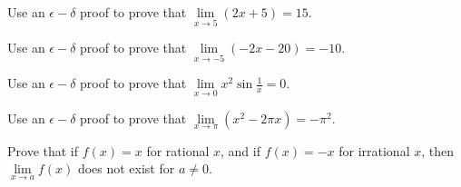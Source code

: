 \documentclass[12pt,letterpaper]{hmcpset}
\begin{document}

\begin{problem}
    Use an $\epsilon-\delta$ proof to prove that $\lim\limits_{x\to 5}\left(2x+5\right) = 15$.
\end{problem}

\begin{solution}

\end{solution}
\newpage

\begin{problem}
    Use an $\epsilon-\delta$ proof to prove that $\lim\limits_{x\to -5}\left(-2x-20\right) = -10$.
\end{problem}

\begin{solution}

\end{solution}
\newpage

\begin{problem}
    Use an $\epsilon-\delta$ proof to prove that $\lim\limits_{x\to 0} x^2\sin{\frac{1}{x}} = 0$.
\end{problem}

\begin{solution}

\end{solution}
\newpage

\begin{problem}
    Use an $\epsilon-\delta$ proof to prove that $\lim\limits_{x\to \pi}\left(x^2 - 2\pi x\right) = -\pi^2$.
\end{problem}

\begin{solution}

\end{solution}
\newpage

\begin{problem}
    Prove that if $f\left(x\right) = x$ for rational $x$, and if $f\left(x\right) = -x$ for irrational $x$, then $\lim\limits_{x\to a}f\left(x\right)$ does not exist for $a \ne 0$.
\end{problem}

\begin{solution}

\end{solution}

\end{document}
